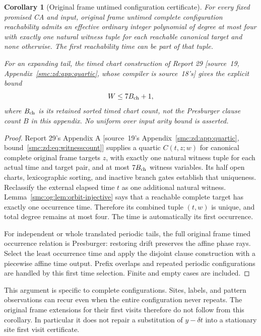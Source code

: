 \documentclass[11pt,letterpaper]{article}
\numberwithin{equation}{section}
\newtheorem{corollary}[theorem]{Corollary}
\theoremstyle{definition}
\theoremstyle{remark}
\begin{document}
\begin{corollary}[Original frame untimed configuration certificate]\label{smc:og:cor:original-target}
For every fixed promised CA and input, original frame untimed complete configuration reachability admits an effective ordinary integer polynomial of degree at most four with exactly one natural witness tuple for each reachable canonical target and none otherwise. The first reachability time can be part of that tuple.

For an expanding tail, the timed chart construction of Report 29 \textup{[source~19, Appendix~\ref{smc:zd:app:quartic}, whose compiler is source~18's]} gives the explicit bound
\[
 W\le7B_{\rm ch}+1,
\]
where $B_{\rm ch}$ is its retained sorted timed chart count, not the Presburger clause count $B$ in this appendix. No uniform over input arity bound is asserted.
\end{corollary}
\begin{proof}
Report 29's Appendix A \textup{[source~19's Appendix~\ref{smc:zd:app:quartic}, bound~\eqref{smc:zd:eq:witnesscount}]} supplies a quartic $C(t,z;w)$ for canonical complete original frame targets $z$, with exactly one natural witness tuple for each actual time and target pair, and at most $7B_{\rm ch}$ witness variables. Its half open charts, lexicographic sorting, and inactive branch gates establish that uniqueness. Reclassify the external elapsed time $t$ as one additional natural witness. Lemma~\ref{smc:og:lem:orbit-injective} says that a reachable complete target has exactly one occurrence time. Therefore its combined tuple $(t,w)$ is unique, and total degree remains at most four. The time is automatically its first occurrence.

For independent or whole translated periodic tails, the full original frame timed occurrence relation is Presburger: restoring drift preserves the affine phase rays. Select the least occurrence time and apply the disjoint clause construction with a piecewise affine time output. Prefix overlaps and repeated periodic configurations are handled by this first time selection. Finite and empty cases are included.
\end{proof}
This argument is specific to complete configurations. Sites, labels, and pattern observations can recur even when the entire configuration never repeats. The original frame extensions for their first visits therefore do not follow from this corollary. In particular it does not repair a substitution of $y-\delta t$ into a stationary site first visit certificate.
\end{document}
